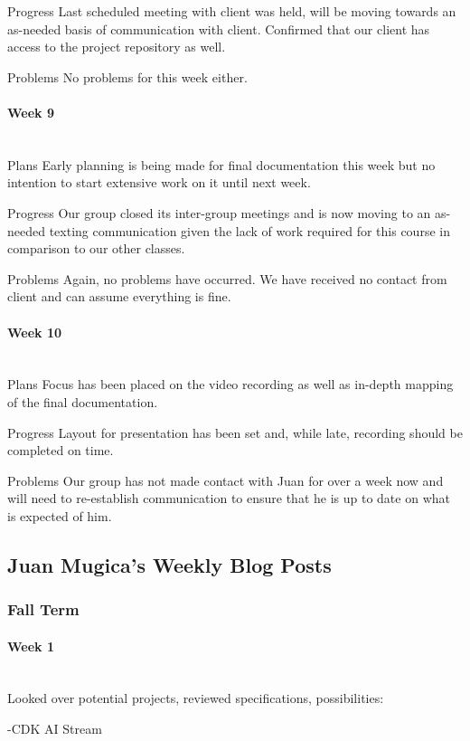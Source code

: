 \documentclass[article, onecolumn, draftclsnofoot,10pt, compsoc]{IEEEtran}
\begin{document}
Progress
Last scheduled meeting with client was held, will be moving towards an as-needed basis of communication with client. Confirmed that our client has access to the project repository as well.
 
Problems
No problems for this week either. 

\paragraph{Week 9}
\mbox{}\\
Plans
Early planning is being made for final documentation this week but no intention to start extensive work on it until next week.
 
Progress
Our group closed its inter-group meetings and is now moving to an as-needed texting communication given the lack of work required for this course in comparison to our other classes.
 
Problems
Again, no problems have occurred. We have received no contact from client and can assume everything is fine.

\paragraph{Week 10}
\mbox{}\\
Plans
Focus has been placed on the video recording as well as in-depth mapping of the final documentation.
 
Progress
Layout for presentation has been set and, while late, recording should be completed on time.
 
Problems
Our group has not made contact with Juan for over a week now and will need to re-establish communication to ensure that he is up to date on what is expected of him.

\subsection{Juan Mugica's Weekly Blog Posts}
\subsubsection{Fall Term}
\paragraph{Week 1}
\mbox{}\\
Looked over potential projects, reviewed specifications, possibilities: 

-CDK AI Stream 
\end{document}
